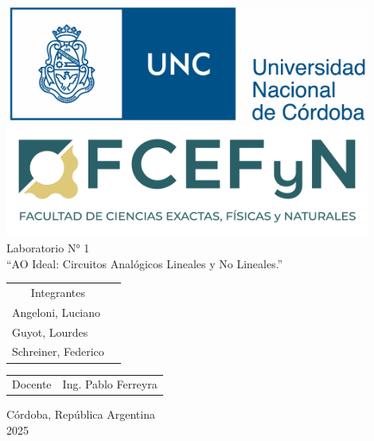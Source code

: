 \begin{titlepage}
    

\thispagestyle{empty}


\begin{center}
    \includegraphics[width=12cm]{img/unc_logo.png} 
    \includegraphics[width=12cm]{img/fcefyn_logo.jpg}
    \\[1cm]
    \vspace{5pt}
     \large Laboratorio N° 1
    \\[0.8cm]
    \large “AO Ideal: Circuitos Analógicos Lineales y No Lineales.”
    \\[0.2cm]
    \vspace{60pt}
    \begin{table}[!h]
    
    \centering
    \begin{tabular}{ll}
    \multicolumn{1}{c}{Integrantes} \\
    Angeloni, Luciano\\
    Guyot, Lourdes \\
    Schreiner, Federico
    \end{tabular}
    \end{table}
    \vspace{20pt}
    \begin{table}[!h]
    \centering
    
    \begin{tabular}{ll}
    \multicolumn{1}{c}{Docente} & Ing. Pablo Ferreyra
    \end{tabular}
    \end{table}
    \vfill
    Córdoba, República Argentina\\
    2025\\
\end{center}

\end{titlepage}